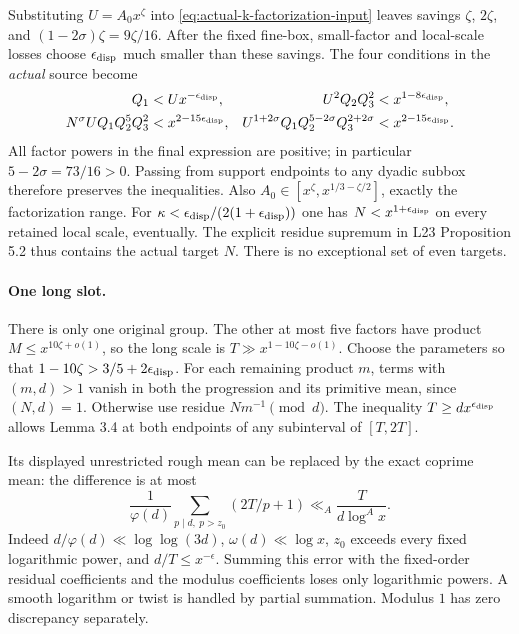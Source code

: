Substituting $U=A_0x^\zeta$ into
\eqref{eq:actual-k-factorization-input} leaves savings
$\zeta$, $2\zeta$, and $(1-2\sigma)\zeta=9\zeta/16$.
After the fixed fine-box, small-factor and local-scale losses choose
$\epsilon_{\rm disp}$ much smaller than these savings. The four
conditions in the \emph{actual} source become
\begin{align*}
 Q_1&<Ux^{-\epsilon_{\rm disp}},&
 U^2Q_2Q_3^2&<x^{1-8\epsilon_{\rm disp}},\\
 N^\sigma UQ_1Q_2^5Q_3^2&<x^{2-15\epsilon_{\rm disp}},&
 U^{1+2\sigma}Q_1Q_2^{5-2\sigma}Q_3^{2+2\sigma}
 &<x^{2-15\epsilon_{\rm disp}}.
\end{align*}
All factor powers in the final expression are positive; in particular
$5-2\sigma=73/16>0$. Passing from support endpoints to any dyadic
subbox therefore preserves the inequalities. Also
$A_0\in[x^\zeta,x^{1/3-\zeta/2}]$, exactly the factorization range.
For $\kappa<\epsilon_{\rm disp}/(2(1+\epsilon_{\rm disp}))$ one has
$N<x^{1+\epsilon_{\rm disp}}$ on every retained local scale, eventually.
The explicit residue supremum in L23 Proposition 5.2 thus contains
the actual target $N$. There is no exceptional set of even targets.

\paragraph{One long slot.}
There is only one original group. The other at most five factors have
product $M\le x^{10\zeta+o(1)}$, so the long scale is
$T\gg x^{1-10\zeta-o(1)}$. Choose the parameters so that
$1-10\zeta>3/5+2\epsilon_{\rm disp}$. For each remaining product
$m$, terms with $(m,d)>1$ vanish in both the progression and its
primitive mean, since $(N,d)=1$. Otherwise use residue
$Nm^{-1}\pmod d$. The inequality $T\ge d x^{\epsilon_{\rm disp}}$
allows Lemma 3.4 at both endpoints of any subinterval of $[T,2T]$.

Its displayed unrestricted rough mean can be replaced by the exact
coprime mean: the difference is at most
\[
 \frac1{\varphi(d)}\sum_{p\mid d,\ p>z_0}(2T/p+1)
 \ll_A \frac{T}{d\log^A x}.
\]
Indeed $d/\varphi(d)\ll\log\log(3d)$, $\omega(d)\ll\log x$,
$z_0$ exceeds every fixed logarithmic power, and $d/T\le x^{-\epsilon}$.
Summing this error with the fixed-order residual coefficients and
the modulus coefficients loses only logarithmic powers. A smooth
logarithm or twist is handled by partial summation. Modulus $1$ has
zero discrepancy separately.


